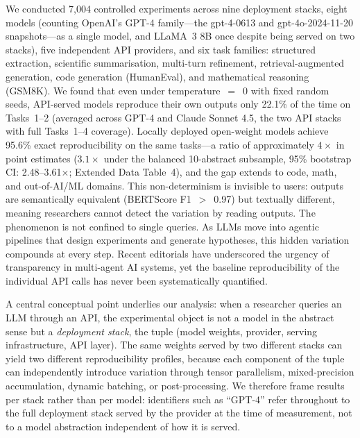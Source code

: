 \documentclass[sn-nature]{sn-jnl}
\begin{document}
We conducted 7{,}004 controlled experiments across nine deployment stacks, eight models (counting OpenAI's GPT-4 family---the gpt-4-0613 and gpt-4o-2024-11-20 snapshots---as a single model, and LLaMA~3 8B once despite being served on two stacks), five independent API providers, and six task families: structured extraction, scientific summarisation, multi-turn refinement, retrieval-augmented generation, code generation (HumanEval), and mathematical reasoning (GSM8K).
We found that even under temperature~$=$~0 with fixed random seeds, API-served models reproduce their own outputs only 22.1\% of the time on Tasks~1--2 (averaged across GPT-4 and Claude Sonnet 4.5, the two API stacks with full Tasks~1--4 coverage). Locally deployed open-weight models achieve 95.6\% exact reproducibility on the same tasks---a ratio of approximately $4\times$ in point estimates ($3.1\times$ under the balanced 10-abstract subsample, 95\% bootstrap CI: 2.48--3.61$\times$; Extended Data Table~4), and the gap extends to code, math, and out-of-AI/ML domains.
This non-determinism is invisible to users: outputs are semantically equivalent (BERTScore F1~$>$~0.97) but textually different, meaning researchers cannot detect the variation by reading outputs.
The phenomenon is not confined to single queries.
As LLMs move into agentic pipelines that design experiments and generate hypotheses\cite{xin2025agentic}, this hidden variation compounds at every step.
Recent editorials have underscored the urgency of transparency in multi-agent AI systems\cite{editorial2026multiagent}, yet the baseline reproducibility of the individual API calls has never been systematically quantified.

A central conceptual point underlies our analysis: when a researcher queries an LLM through an API, the experimental object is not a model in the abstract sense but a \emph{deployment stack}, the tuple (model weights, provider, serving infrastructure, API layer).
The same weights served by two different stacks can yield two different reproducibility profiles, because each component of the tuple can independently introduce variation through tensor parallelism, mixed-precision accumulation, dynamic batching, or post-processing.
We therefore frame results per stack rather than per model: identifiers such as ``GPT-4'' refer throughout to the full deployment stack served by the provider at the time of measurement, not to a model abstraction independent of how it is served.
\end{document}
